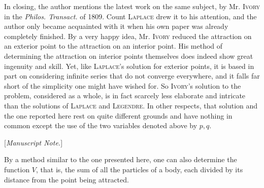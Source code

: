 In closing, the author mentions the latest work on the same subject, by Mr. \textsc{Ivory} in the \textit{Philos. Transact.} of 1809. Count \textsc{Laplace} drew it to his attention, and the author only became acquainted with it when his own paper was already completely finished. By a very happy idea, Mr. \textsc{Ivory} reduced the attraction on an exterior point to the attraction on an interior point. His method of determining the attraction on interior points themselves does indeed show great ingenuity and skill. Yet, like \textsc{Laplace}'s solution for exterior points, it is based in part on considering infinite series that do not converge everywhere, and it falls far short of the simplicity one might have wished for. So \textsc{Ivory}'s solution to the problem, considered as a whole, is in fact scarcely less elaborate and intricate than the solutions of \textsc{Laplace} and \textsc{Legendre}. In other respects, that solution and the one reported here rest on quite different grounds and have nothing in common except the use of the two variables denoted above by $p,q$.

\bigskip
\begin{center}
[\textit{Manuscript Note.}]
\end{center}
\medskip
By a method similar to the one presented here, one can also determine the function $V$, that is, the sum of all the particles of a body, each divided by its distance from the point being attracted.
